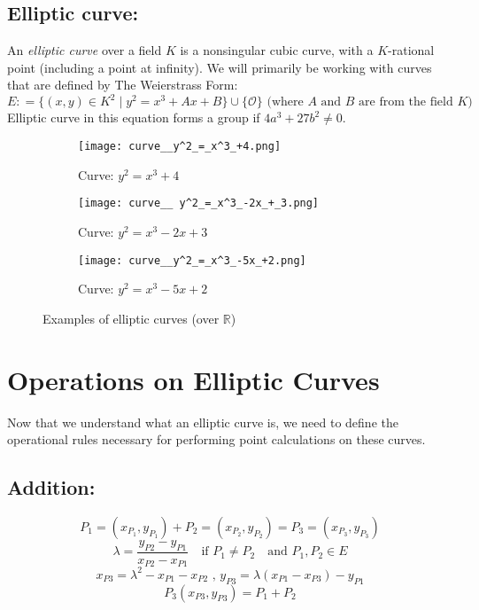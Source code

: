 \documentclass[bp,en]{FEIstyle}
\newcommand{\point}[1]{%
    #1 = (x_{#1}, y_{#1}) %
}
\begin{document}
\subsection*{Elliptic curve:}
An \textit{elliptic curve} over a field $K$ is a nonsingular cubic curve, with a $K$-rational point (including a point at infinity). 
We will primarily be working with curves that are defined by The Weierstrass Form:
\[
E: = \{ (x,y) \in K^2 \mid y^2=x^3+Ax+B\}\cup\{\mathcal{O}\} 
\text{  (where $A$ and $B$ are from the field $K$)}
\]
Elliptic curve in this equation forms a group if \(4a^3 + 27b^2 \neq 0\).
\begin{figure}[htbp]
    \centering
    \begin{subfigure}{0.3\textwidth}
        \texttt{[image: curve\_\_y^2\_=\_x^3\_+4.png]}
        \caption{Curve: $y^2 = x^3 + 4$}
        \label{fig:curve1}
    \end{subfigure}%
    \hfill %
    \begin{subfigure}{0.3\textwidth}
        \texttt{[image: curve\_\_ y^2\_=\_x^3\_-2x\_+\_3.png]}
        \caption{Curve: $y^2 = x^3 - 2x + 3$}
        \label{fig:curve2}
    \end{subfigure}%
    \hfill %
    \begin{subfigure}{0.3\textwidth}
        \texttt{[image: curve\_\_y^2\_=\_x^3\_-5x\_+2.png]}
        \caption{Curve: $y^2 = x^3 - 5x + 2$}
        \label{fig:curve3}
    \end{subfigure}
    \caption{Examples of elliptic curves (over $\mathbb{R}$)}
    \label{fig:elliptic_curves}
\end{figure}
\newpage


\section*{Operations on Elliptic Curves}

Now that we understand what an elliptic curve is, we need to define the operational rules necessary for performing point calculations on these curves.

\subsection*{Addition:}
\[
\point{P_1} + \point{P_2} = \point{P_3}
\]
\[
\lambda = \frac{y_{P2} - y_{P1}}{x_{P2} - x_{P1}} \quad \text{if } P_1 \neq P_2 \quad \text{and } P_1, P_2 \in E
\]
\[
x_{P3} = \lambda^2 - x_{P1} - x_{P2} \text{ , } y_{P3} = \lambda(x_{P1} - x_{P3}) - y_{P1}
\]
\[
P_3(x_{P3}, y_{P3}) = P_1 + P_2
\]
\end{document}
